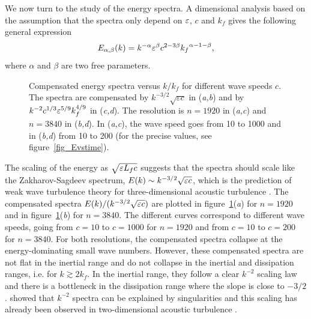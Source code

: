 We now turn to the study of the energy spectra.  A dimensional
analysis based on the assumption that the spectra only depend on
$\varepsilon$, $c$ and $k_f$ gives the following general expression
\begin{equation}
E_{\alpha, \beta}(k) = k^{-\alpha} \varepsilon^\beta   c^{2- 3\beta}
{k_f}^{\alpha -1 - \beta}, \label{eq_E_alpha_beta}
\end{equation}
where $\alpha$ and $\beta$ are two free parameters.



\begin{figure}
\caption{
Compensated energy spectra versus $k/k_f$ for different wave speeds $c$.
%
The spectra are compensated by $k^{-3/2}\sqrt{\varepsilon c} $
in (\textit{a,b})
and by $k^{-2}c^{1/3} \varepsilon^{5/9} k_f^{4/9} $
in (\textit{c,d}).
%
The resolution is
$n = 1920$ in (\textit{a,c}) and
$n = 3840$ in (\textit{b,d}).
%
In (\textit{a,c}), the wave speed goes from 10 to 1000
and
in (\textit{b,d}) from 10 to 200
(for the precise values, see figure~\ref{fig_Evstime}).
}
\label{fig_spectra_c}
\end{figure}


The scaling of the energy as $\sqrt{\varepsilon L_f c}$ suggests that the
spectra should scale like the Zakharov-Sagdeev spectrum, $E(k) \sim
k^{-3/2}\sqrt{\varepsilon c}$, which is the prediction of weak wave
turbulence theory for three-dimensional acoustic turbulence
\cite[]{Nazarenko2011}.
%
The compensated spectra $E(k) / ( k^{-3/2}\sqrt{\varepsilon c})$ are plotted
in figure~\ref{fig_spectra_c}(\textit{a}) for $n = 1920$ and in
figure~\ref{fig_spectra_c}(\textit{b}) for $n = 3840$.  The different
curves correspond to different wave speeds, going from $c=10$ to
$c=1000$ for $n = 1920$ and from $c=10$ to $c=200$ for $n = 3840$.
%
For both resolutions, the compensated spectra collapse at the
energy-dominating small wave numbers.
%
However, these compensated spectra are not flat in the inertial range
and do not collapse in the inertial and dissipation ranges, i.e. for
$k\gtrsim 2k_f$.  In the inertial range, they follow a clear $k^{-2}$
scaling law and there is a bottleneck in the dissipation range where
the slope is close to $-3/2$.
%
\cite{Kuznetsov2004} showed that $k^{-2}$ spectra can be explained by
singularities and this scaling has already been observed in
two-dimensional acoustic turbulence \cite[]{FalkovichMeyer1996}.
%

